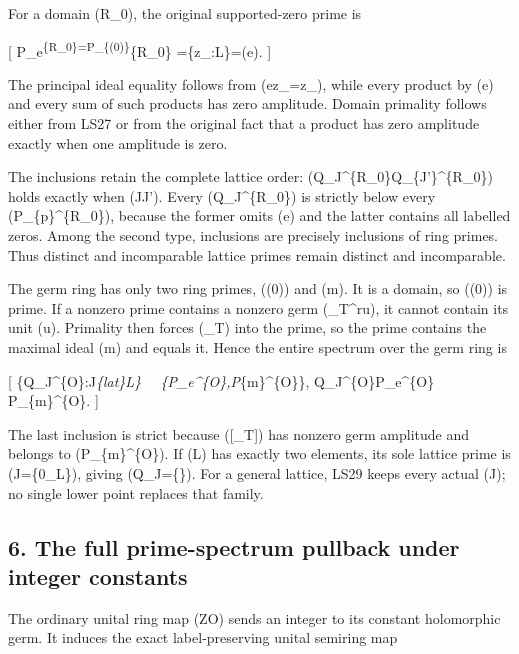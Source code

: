 \documentclass[
]{article}
\begin{document}
For a domain (R\_0), the original supported-zero prime is

{[} P\_e\textsuperscript{\{R\_0\}=P\_\{(0)\}}\{R\_0\}
=\{z\_\lambda:\lambda\in L\}=(e).  {]}

The principal ideal equality follows from (ez\_\lambda=z\_\lambda),
while every product by (e) and every sum of such products has zero
amplitude. Domain primality follows either from LS27 or from the
original fact that a product has zero amplitude exactly when one
amplitude is zero.

The inclusions retain the complete lattice order:
(Q\_J\^{}\{R\_0\}\subseteq Q\_\{J'\}\^{}\{R\_0\}) holds exactly when
(J\subseteq J'). Every (Q\_J\^{}\{R\_0\}) is strictly below every
(P\_\{\mathfrak p\}\^{}\{R\_0\}), because the former omits (e) and the
latter contains all labelled zeros. Among the second type, inclusions
are precisely inclusions of ring primes. Thus distinct and incomparable
lattice primes remain distinct and incomparable.

The germ ring has only two ring primes, ((0)) and (\mathfrak m). It is a
domain, so ((0)) is prime. If a nonzero prime contains a nonzero germ
(\tau\_T\^{}ru), it cannot contain its unit (u). Primality then forces
(\tau\_T) into the prime, so the prime contains the maximal ideal
(\mathfrak m) and equals it. Hence the entire spectrum over the germ
ring is

{[} \{Q\_J\^{}\{\mathcal O\}:J\in{}\emph{\{\rm lat\}L\}
~\sqcup~\{P\_e\^{}\{\mathcal O\},P}\{\mathfrak m\}\^{}\{\mathcal O\}\},
\qquad Q\_J\^{}\{\mathcal O\}\subsetneq P\_e\^{}\{\mathcal O\}
\subsetneq P\_\{\mathfrak m\}\^{}\{\mathcal O\}.  {]}

The last inclusion is strict because ({[}\tau\_T{]}) has nonzero germ
amplitude and belongs to (P\_\{\mathfrak m\}\^{}\{\mathcal O\}). If (L)
has exactly two elements, its sole lattice prime is (J=\{0\_L\}), giving
(Q\_J=\{\tau\}). For a general lattice, LS29 keeps every actual (J); no
single lower point replaces that family.

\subsection{6. The full prime-spectrum pullback under integer
constants}\label{the-full-prime-spectrum-pullback-under-integer-constants}

The ordinary unital ring map (\mathbb Z\to\mathcal O) sends an integer
to its constant holomorphic germ. It induces the exact label-preserving
unital semiring map
\end{document}
